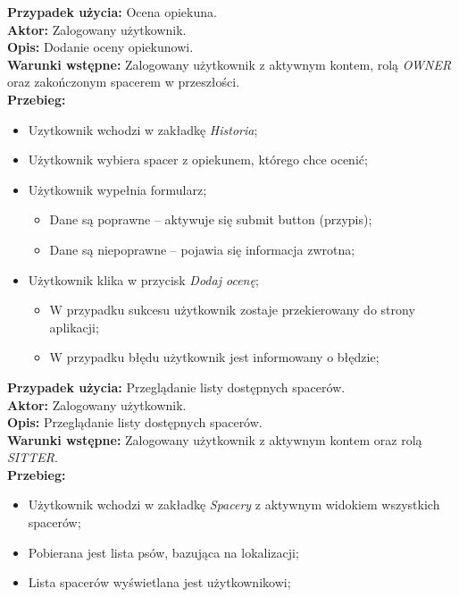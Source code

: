 \noindent
\textbf{Przypadek użycia:} Ocena opiekuna. \\
\textbf{Aktor:} Zalogowany użytkownik. \\
\textbf{Opis:} Dodanie oceny opiekunowi. \\
\textbf{Warunki wstępne:}  Zalogowany użytkownik z aktywnym kontem, rolą \textit{OWNER} oraz zakończonym spacerem w przeszłości. \\
\textbf{Przebieg:}
\begin{itemize}[leftmargin=1cm]
    \item Uzytkownik wchodzi w zakładkę \textit{Historia};
    \item Użytkownik wybiera spacer z opiekunem, którego chce ocenić;
    \item Użytkownik wypełnia formularz;
    \begin{itemize}
        \item Dane są poprawne -- aktywuje się submit button (przypis);
        \item Dane są niepoprawne -- pojawia się informacja zwrotna;
    \end{itemize}
    \item Użytkownik klika w przycisk \textit{Dodaj ocenę};
    \begin{itemize}
        \item W przypadku sukcesu użytkownik zostaje przekierowany do strony aplikacji;
        \item W przypadku błędu użytkownik jest informowany o błędzie;
    \end{itemize}
\end{itemize}

\noindent
\textbf{Przypadek użycia:} Przeglądanie listy dostępnych spacerów. \\
\textbf{Aktor:} Zalogowany użytkownik. \\
\textbf{Opis:}  Przeglądanie listy dostępnych spacerów. \\
\textbf{Warunki wstępne:} Zalogowany użytkownik z aktywnym kontem oraz rolą \textit{SITTER}. \\
\textbf{Przebieg:}
\begin{itemize}[leftmargin=1cm]
    \item Użytkownik wchodzi w zakładkę \textit{Spacery} z aktywnym widokiem wszystkich spacerów;
    \item Pobierana jest lista psów, bazująca na lokalizacji;
    \item Lista spacerów wyświetlana jest użytkownikowi;
\end{itemize}

